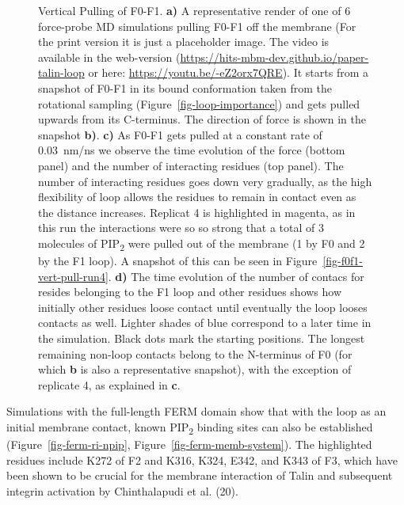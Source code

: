 \documentclass[
  twocolumn]{biophys-new-mod}
\begin{document}
\begin{figure}
\begin{minipage}[t]{0.50\linewidth}
\subcaption{\label{fig-f0f1-vert-pull-contacts}~}
\end{minipage}%

\caption{\label{fig-vert-pull}Vertical Pulling of F0-F1. \textbf{a)} A
representative render of one of 6 force-probe MD simulations pulling
F0-F1 off the membrane (For the print version it is just a placeholder
image. The video is available in the web-version
(\url{https://hits-mbm-dev.github.io/paper-talin-loop} or here:
\url{https://youtu.be/-eZ2orx7QRE}). It starts from a snapshot of F0-F1
in its bound conformation taken from the rotational sampling
(Figure~\ref{fig-loop-importance}) and gets pulled upwards from its
C-terminus. The direction of force is shown in the snapshot \textbf{b)}.
\textbf{c)} As F0-F1 gets pulled at a constant rate of 0.03~nm/ns we
observe the time evolution of the force (bottom panel) and the number of
interacting residues (top panel). The number of interacting residues
goes down very gradually, as the high flexibility of loop allows the
residues to remain in contact even as the distance increases. Replicat 4
is highlighted in magenta, as in this run the interactions were so so
strong that a total of 3 molecules of PIP\textsubscript{2} were pulled
out of the membrane (1 by F0 and 2 by the F1 loop). A snapshot of this
can be seen in Figure~\ref{fig-f0f1-vert-pull-run4}. \textbf{d)} The
time evolution of the number of contacs for resides belonging to the F1
loop and other residues shows how initially other residues loose contact
until eventually the loop looses contacts as well. Lighter shades of
blue correspond to a later time in the simulation. Black dots mark the
starting positions. The longest remaining non-loop contacts belong to
the N-terminus of F0 (for which \textbf{b} is also a representative
snapshot), with the exception of replicate 4, as explained in
\textbf{c}.}

\end{figure}

Simulations with the full-length FERM domain show that with the loop as
an initial membrane contact, known PIP\textsubscript{2} binding sites
can also be established
(Figure~\ref{fig-ferm-ri-npip}, Figure~\ref{fig-ferm-memb-system}). The
highlighted residues include K272 of F2 and K316, K324, E342, and K343
of F3, which have been shown to be crucial for the membrane interaction
of Talin and subsequent integrin activation by Chinthalapudi et al.
(20).
\end{document}
